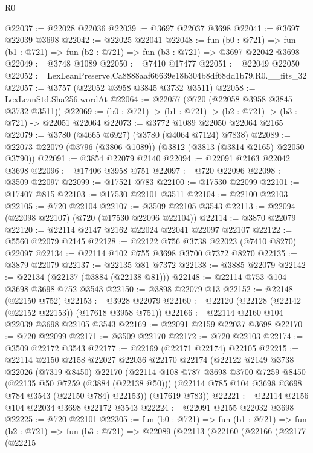 \begin{lexlean}{R0}
\begin{coremodule}
@22037 := @22028 @22036
@22039 := @3697 @22037 @3698
@22041 := @3697 @22039 @3698
@22042 := @22025 @22041
@22048 := fun (b0 : @721) =>
  fun (b1 : @721) => fun (b2 : @721) => fun (b3 : @721) => @3697 @22042 @3698
@22049 := @3748 @1089
@22050 := @7410 @17477
@22051 := @22049 @22050
@22052 := LexLeanPreserve.Ca8888aaf66639e18b304b8df68dd1b79.R0.__fits_32
@22057 := @3757 (@22052 @3958 @3845 @3732 @3511)
@22058 := LexLeanStd.Sha256.wordAt
@22064 := @22057 (@720 (@22058 @3958 @3845 @3732 @3511))
@22069 := (b0 : @721) -> (b1 : @721) -> (b2 : @721) -> (b3 : @721) -> @22051 @22064
@22073 := @3772 @1089 @22050 @22064 @2165
@22079 := @3780 (@4665 @6927) (@3780 (@4064 @7124) @7838)
@22089 := @22073 @22079 (@3796 (@3806 @1089)) (@3812 (@3813 (@3814 @2165) @22050 @3790))
@22091 := @3854 @22079 @2140
@22094 := @22091 @2163 @22042 @3698
@22096 := @17406 @3958 @751
@22097 := @720 @22096
@22098 := @3509 @22097
@22099 := @17521 @783
@22100 := @17530 @22099
@22101 := @17407 @815
@22103 := @17530 @22101 @3511
@22104 := @22100 @22103
@22105 := @720 @22104
@22107 := @3509 @22105 @3543
@22113 := @22094 (@22098 @22107) (@720 (@17530 @22096 @22104))
@22114 := @3870 @22079
@22120 := @22114 @2147 @2162 @22024 @22041 @22097 @22107
@22122 := @5560 @22079 @2145
@22128 := @22122 @756 @3738 @22023 (@7410 @8270) @22097
@22134 := @22114 @102 @755 @3698 @3700 @7372 @8270
@22135 := @3879 @22079
@22137 := @22135 @81 @7372
@22138 := @3885 @22079
@22142 := @22134 (@22137 (@3884 (@22138 @81)))
@22148 := @22114 @753 @104 @3698 @3698 @752 @3543
@22150 := @3898 @22079 @13
@22152 := @22148 (@22150 @752)
@22153 := @3928 @22079
@22160 := @22120 (@22128 (@22142 (@22152 @22153)) (@17618 @3958 @751))
@22166 := @22114 @2160 @104 @22039 @3698 @22105 @3543
@22169 := @22091 @2159 @22037 @3698
@22170 := @720 @22099
@22171 := @3509 @22170
@22172 := @720 @22103
@22174 := @3509 @22172 @3543
@22177 := @22169 (@22171 @22174) @22105
@22215 := @22114
    @2150
    @2158
    @22027
    @22036
    @22170
    @22174
    (@22122
      @2149
      @3738
      @22026
      (@7319 @8450)
      @22170
      (@22114
        @108
        @787
        @3698
        @3700
        @7259
        @8450
        (@22135 @50 @7259 (@3884 (@22138 @50)))
        (@22114 @785 @104 @3698 @3698 @784 @3543 (@22150 @784) @22153))
      (@17619 @783))
@22221 := @22114 @2156 @104 @22034 @3698 @22172 @3543
@22224 := @22091 @2155 @22032 @3698
@22225 := @720 @22101
@22305 := fun (b0 : @721) =>
  fun (b1 : @721) =>
  fun (b2 : @721) =>
  fun (b3 : @721) =>
  @22089
    (@22113
      (@22160
        (@22166
          (@22177
            (@22215

\end{coremodule}
\end{lexlean}

